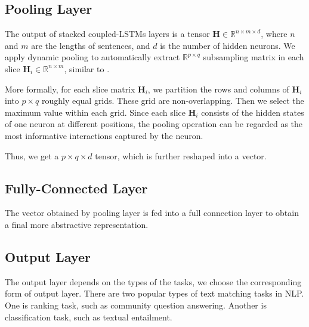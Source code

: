 \documentclass{article}
\def\H{\mathbf{H}}
\def\R{\mathbb{R}}
\begin{document}


\subsection{Pooling Layer}

The output of stacked coupled-LSTMs layers is a tensor $\H \in \R^{n\times m \times d}$, where $n$ and $m$ are the lengths of sentences, and $d$ is the number of hidden neurons. We apply dynamic pooling to automatically extract $\R^{p \times q}$ subsampling matrix in each slice $\H_i \in \R^{n \times m}$, similar to \cite{socher2011dynamic}.

More formally, for each slice  matrix $\H_i$, we partition the rows and columns of $\H_i$ into $p \times q$ roughly equal grids. These grid are non-overlapping. Then we select the maximum value within each grid.
Since each slice $\H_i$ consists of the hidden states of one neuron at different positions, the pooling operation can be regarded as the most informative interactions captured by the neuron.


Thus, we get a $p \times q \times d $ tensor, which is further reshaped into a vector.

\subsection{Fully-Connected Layer}

The vector obtained by pooling layer is fed into a full connection layer to obtain a final more abstractive representation.

\subsection{Output Layer}

The output layer depends on the types of the tasks, we choose the corresponding form of output layer.
There are two popular types of text matching tasks in NLP. One is ranking task, such as community question answering. Another is classification task, such as textual entailment.
\end{document}
